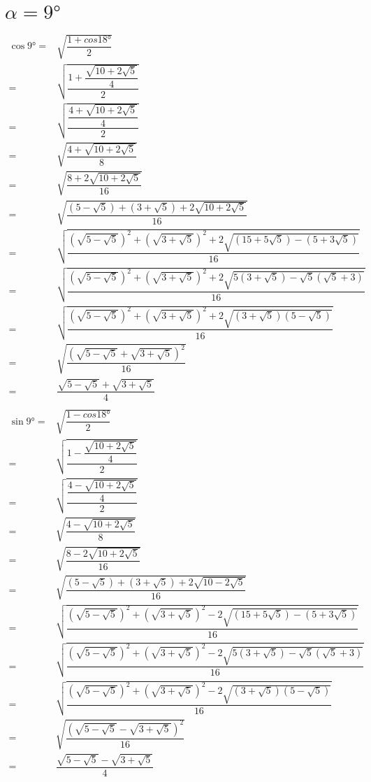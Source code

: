 \section{$\alpha=\ang{9}$}
\begin{align*}
	\cos\ang{9}=&\sqrt{\dfrac{1+cos\ang{18}}{2}}\\
	=&\sqrt{\dfrac{1+\dfrac{\sqrt{10+2\sqrt{5}}}{4}}{2}}\\
	=&\sqrt{\dfrac{\dfrac{4+\sqrt{10+2\sqrt{5}}}{4}}{2}}\\
	=&\sqrt{\dfrac{4+\sqrt{10+2\sqrt{5}}}{8}}\\
	=&\sqrt{\dfrac{8+2\sqrt{10+2\sqrt{5}}}{16}}\\
	=&\sqrt{\dfrac{(5-\sqrt{5})+(3+\sqrt{5})+2\sqrt{10+2\sqrt{5}}}{16}}\\
	=&\sqrt{\dfrac{\left(\sqrt{5-\sqrt{5}}\right)^2+\left(\sqrt{3+\sqrt{5}}\right)^2+2\sqrt{(15+5\sqrt{5})-(5+3\sqrt{5})}}{16}}\\
	=&\sqrt{\dfrac{\left(\sqrt{5-\sqrt{5}}\right)^2+\left(\sqrt{3+\sqrt{5}}\right)^2+2\sqrt{5(3+\sqrt{5})-\sqrt{5}(\sqrt{5}+3)}}{16}}\\
	=&\sqrt{\dfrac{\left(\sqrt{5-\sqrt{5}}\right)^2+\left(\sqrt{3+\sqrt{5}}\right)^2+2\sqrt{(3+\sqrt{5})(5-\sqrt{5})}}{16}}\\
	=&\sqrt{\dfrac{\left(\sqrt{5-\sqrt{5}}+\sqrt{3+\sqrt{5}}\right)^2}{16}}\\
	=&\dfrac{\sqrt{5-\sqrt{5}}+\sqrt{3+\sqrt{5}}}{4}\\
\end{align*}
\begin{align*}
	\sin\ang{9}=&\sqrt{\dfrac{1-cos\ang{18}}{2}}\\
	=&\sqrt{\dfrac{1-\dfrac{\sqrt{10+2\sqrt{5}}}{4}}{2}}\\
	=&\sqrt{\dfrac{\dfrac{4-\sqrt{10+2\sqrt{5}}}{4}}{2}}\\
	=&\sqrt{\dfrac{4-\sqrt{10+2\sqrt{5}}}{8}}\\
	=&\sqrt{\dfrac{8-2\sqrt{10+2\sqrt{5}}}{16}}\\
	=&\sqrt{\dfrac{(5-\sqrt{5})+(3+\sqrt{5})+2\sqrt{10-2\sqrt{5}}}{16}}\\
	=&\sqrt{\dfrac{\left(\sqrt{5-\sqrt{5}}\right)^2+\left(\sqrt{3+\sqrt{5}}\right)^2-2\sqrt{(15+5\sqrt{5})-(5+3\sqrt{5})}}{16}}\\
	=&\sqrt{\dfrac{\left(\sqrt{5-\sqrt{5}}\right)^2+\left(\sqrt{3+\sqrt{5}}\right)^2-2\sqrt{5(3+\sqrt{5})-\sqrt{5}(\sqrt{5}+3)}}{16}}\\
	=&\sqrt{\dfrac{\left(\sqrt{5-\sqrt{5}}\right)^2+\left(\sqrt{3+\sqrt{5}}\right)^2-2\sqrt{(3+\sqrt{5})(5-\sqrt{5})}}{16}}\\
	=&\sqrt{\dfrac{\left(\sqrt{5-\sqrt{5}}-\sqrt{3+\sqrt{5}}\right)^2}{16}}\\
	=&\dfrac{\sqrt{5-\sqrt{5}}-\sqrt{3+\sqrt{5}}}{4}\\
\end{align*}

